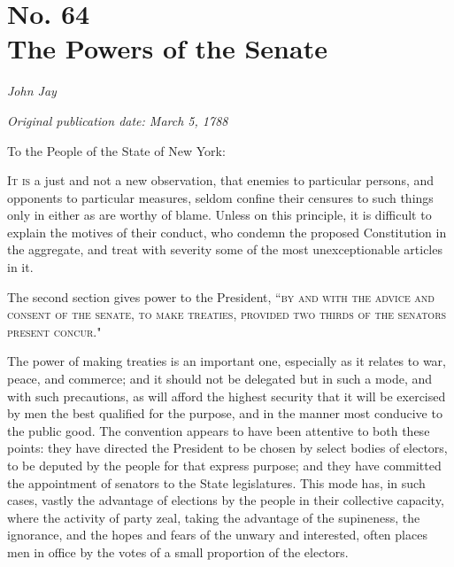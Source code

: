 \chapter[No. 64: The Powers of the Senate]{No. 64\\ {\small The Powers of the Senate}}

\textit{John Jay}

\textit{Original publication date: March 5, 1788}
\vspace{1cm}

To the People of the State of New York:
\vspace{.4cm}

\textsc{It is} a just and not a new observation, that enemies to particular persons, and opponents to particular measures, seldom confine their censures to such things only in either as are worthy of blame. 
Unless on this principle, it is difficult to explain the motives of their conduct, who condemn the proposed Constitution in the aggregate, and treat with severity some of the most unexceptionable articles in it.

The second section gives power to the President, ``\textsc{by and with the advice and consent of the senate}, \textsc{to make treaties}, \textsc{provided two thirds of the senators present concur}."

The power of making treaties is an important one, especially as it relates to war, peace, and commerce; and it should not be delegated but in such a mode, and with such precautions, as will afford the highest security that it will be exercised by men the best qualified for the purpose, and in the manner most conducive to the public good. 
The convention appears to have been attentive to both these points: they have directed the President to be chosen by select bodies of electors, to be deputed by the people for that express purpose; and they have committed the appointment of senators to the State legislatures. 
This mode has, in such cases, vastly the advantage of elections by the people in their collective capacity, where the activity of party zeal, taking the advantage of the supineness, the ignorance, and the hopes and fears of the unwary and interested, often places men in office by the votes of a small proportion of the electors.

